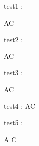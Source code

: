 \documentclass[a4paper,oneside,11pt]{book}
\begin{document}
test1 : 

AC

test2 : 

AC

test3 : 

AC

test4 : 
AC

test5 : 

A
C
\end{document}
